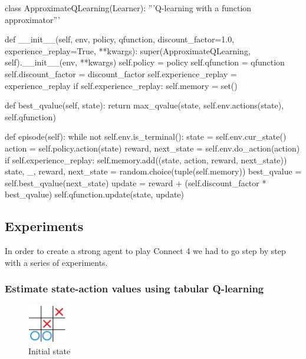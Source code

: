 \documentclass{article}
\begin{document}
\begin{python}
class ApproximateQLearning(Learner):
    '''Q-learning with a function approximator'''

    def __init__(self, env, policy, qfunction, discount_factor=1.0,
                 experience_replay=True, **kwargs):
        super(ApproximateQLearning, self).__init__(env, **kwargs)
        self.policy = policy
        self.qfunction = qfunction
        self.discount_factor = discount_factor
        self.experience_replay = experience_replay
        if self.experience_replay:
            self.memory = set()

    def best_qvalue(self, state):
        return max_qvalue(state, self.env.actions(state), self.qfunction)

    def episode(self):
        while not self.env.is_terminal():
            state = self.env.cur_state()
            action = self.policy.action(state)
            reward, next_state = self.env.do_action(action)
            if self.experience_replay:
                self.memory.add((state, action, reward, next_state))
                state, _, reward, next_state = random.choice(tuple(self.memory))
            best_qvalue = self.best_qvalue(next_state)
            update = reward + (self.discount_factor * best_qvalue)
            self.qfunction.update(state, update)

\end{python}

\pagebreak[4]

\subsection{Experiments}

In order to create a strong agent to play Connect 4 we had to go step by step with a series of
experiments.

\subsubsection{Estimate state-action values using tabular Q-learning}


\begin{figure}
    \centering
    \includegraphics[width=0.15\textwidth]{figures/tic_ql_tab_current.pdf}
    \caption{Initial state}
    \label{fig:tic-ql-tab-cur}
\end{figure}
\end{document}
